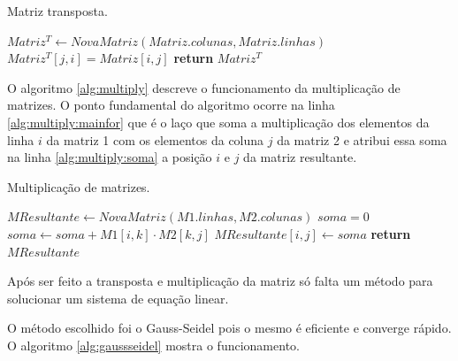 \documentclass[11pt]{article}
\begin{document}
\begin{algorithm}
\caption{Matriz transposta.}\label{alg:transpose}
\begin{algorithmic}[1]
\State $Matriz^T \gets NovaMatriz(Matriz.colunas,Matriz.linhas)$ 
\State $Matriz^T[j,i] = Matriz[i,j]$
\EndFor
\EndFor
\State \textbf{return} $Matriz^T$
\EndProcedure
\end{algorithmic}
\end{algorithm}


O algoritmo \ref{alg:multiply} descreve o funcionamento da multiplicação de matrizes.
O ponto fundamental do algoritmo ocorre na linha \ref{alg:multiply:mainfor} que é o laço que soma a multiplicação dos elementos da linha \(i\) da matriz 1 com os elementos da coluna \(j\) da matriz 2 e atribui essa soma na linha \ref{alg:multiply:soma} a posição \(i\) e \(j\) da matriz resultante.

\begin{algorithm}
\caption{Multiplicação de matrizes.}\label{alg:multiply}
\begin{algorithmic}[1]
\State $MResultante \gets NovaMatriz(M1.linhas,M2.colunas)$ 
\State $soma = 0$
\label{alg:multiply:mainfor}
\State $soma \gets soma + M1[i,k] \cdot M2[k,j]$
\EndFor
\State $MResultante[i,j] \gets soma$\label{alg:multiply:soma}
\EndFor
\EndFor
\State \textbf{return} $MResultante$
\EndProcedure
\end{algorithmic}
\end{algorithm}


Após ser feito a transposta e multiplicação da matriz só falta um método para solucionar um sistema de equação linear.

O método escolhido foi o Gauss-Seidel pois o mesmo é eficiente e converge rápido.
O algoritmo \ref{alg:gaussseidel} mostra o funcionamento.
\end{document}
